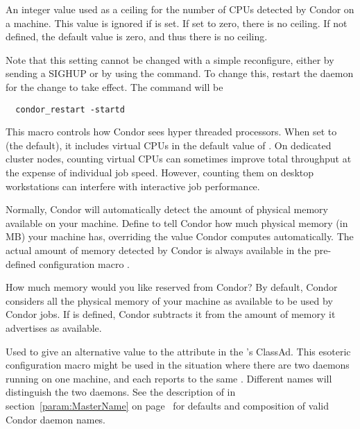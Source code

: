 \begin{description}
\label{param:MaxNumCpus}
\item[\Macro{MAX\_NUM\_CPUS}]
  An integer value used as a ceiling for the number of CPUs detected
  by Condor on a machine.
  This value is ignored if  is set.
  If set to zero, there is no ceiling. 
  If not defined, the default value is zero, and thus there is no ceiling. 

  Note that this setting cannot be changed with a simple reconfigure, 
  either by sending a SIGHUP or by using the  command.
  To change this, restart the  daemon for the
  change to take effect. The command will be
\begin{verbatim}
  condor_restart -startd
\end{verbatim}

\label{param:CountHyperthreadCpus}
\item[\Macro{COUNT\_HYPERTHREAD\_CPUS}]
  This macro controls how Condor sees hyper threaded
  processors. When set to  (the default), it includes virtual CPUs in
  the default value of . On dedicated cluster nodes, 
  counting virtual CPUs can sometimes improve total throughput at the expense 
  of individual job speed. However, counting them on desktop workstations can
  interfere with interactive job performance.

\label{param:Memory}
\item[\Macro{MEMORY}]
  Normally, Condor will automatically detect the amount of physical
  memory available on your machine.  Define  to tell
  Condor how much physical memory (in MB) your machine has, overriding
  the value Condor computes automatically.  The actual amount of memory
  detected by Condor is always available in the pre-defined configuration
  macro .

\label{param:ReservedMemory}
\item[\Macro{RESERVED\_MEMORY}]
  How much memory would you like reserved from Condor?  By default,
  Condor considers all the physical memory of your machine as
  available to be used by Condor jobs.  If  is
  defined, Condor subtracts it from the amount of memory it advertises
  as available.

\label{param:StartdName}
\item[\Macro{STARTD\_NAME}]
  Used to give an alternative value to the  attribute
  in the 's ClassAd.
  This esoteric configuration macro might be used in the situation
  where there are two  daemons running on one machine,
  and each reports to the same .
  Different names will distinguish the two daemons.
  See the description of  in
  section~\ref{param:MasterName} on page~\pageref{param:MasterName}
  for defaults and composition of valid Condor daemon names.


\end{description}
